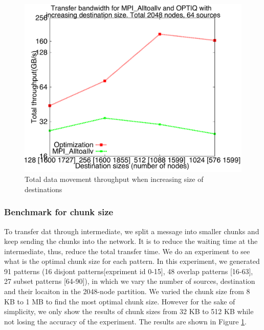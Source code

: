 \begin{figure}[!htb]
\vspace{-0.1in}
\centering
\includegraphics[scale=0.30]{figures/incrsize.pdf}
\vspace{-0.1in}
\caption{Total data movement throughput when increasing size of destinations}
\vspace{-0.1in}
\label{fig:chunksize}
\end{figure}

\subsubsection{Benchmark for chunk size}

To transfer dat through intermediate, we split a message into smaller chunks and keep sending the chunks into the network. It is to reduce the waiting time at the intermediate, thus, reduce the total transfer time. We do an experiment to see what is the optimal chunk size for each pattern. In this experiment, we generated 91 patterns (16 disjont patterns[expriment id 0-15], 48 overlap patterns [16-63], 27 subset patterns [64-90]), in which we vary the number of sources, destination and their locaiton in the 2048-node partition. We varied the chunk size from 8 KB to 1 MB to find the most optimal chunk size. However for the sake of simplicity, we only show the results of chunk sizes from 32 KB to 512 KB while not losing the accuracy of the experiment. The results are shown in Figure \ref{fig:chunksize}.


